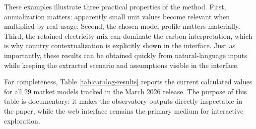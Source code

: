 \documentclass[10pt,a4paper]{article}
\begin{document}
These examples illustrate three practical properties of the method. First, annualization matters: apparently small unit values become relevant when multiplied by real usage. Second, the chosen model profile matters materially. Third, the retained electricity mix can dominate the carbon interpretation, which is why country contextualization is explicitly shown in the interface. Just as importantly, these results can be obtained quickly from natural-language inputs while keeping the extracted scenario and assumptions visible in the interface.

For completeness, Table \ref{tab:catalog-results} reports the current calculated values for all 29 market models tracked in the March 2026 release. The purpose of this table is documentary: it makes the observatory outputs directly inspectable in the paper, while the web interface remains the primary medium for interactive exploration.
\end{document}
